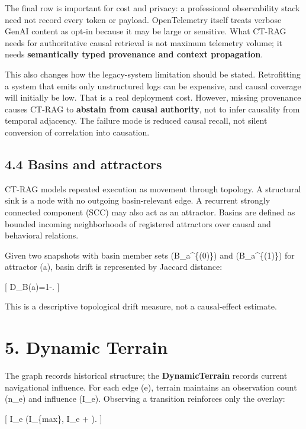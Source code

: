 \documentclass[
  11pt,
]{article}
\begin{document}
The final row is important for cost and privacy: a professional
observability stack need not record every token or payload.
OpenTelemetry itself treats verbose GenAI content as opt-in because it
may be large or sensitive. What CT-RAG needs for authoritative causal
retrieval is not maximum telemetry volume; it needs \textbf{semantically
typed provenance and context propagation}.

This also changes how the legacy-system limitation should be stated.
Retrofitting a system that emits only unstructured logs can be expensive,
and causal coverage will initially be low. That is a real deployment
cost. However, missing provenance causes CT-RAG to \textbf{abstain from
causal authority}, not to infer causality from temporal adjacency. The
failure mode is reduced causal recall, not silent conversion of
correlation into causation.

\subsection{4.4 Basins and attractors}\label{basins-and-attractors}

CT-RAG models repeated execution as movement through topology. A
structural sink is a node with no outgoing basin-relevant edge. A
recurrent strongly connected component (SCC) may also act as an
attractor. Basins are defined as bounded incoming neighborhoods of
registered attractors over causal and behavioral relations.

Given two snapshots with basin member sets (B\_a\^{}\{(0)\}) and
(B\_a\^{}\{(1)\}) for attractor (a), basin drift is represented by
Jaccard distance:

{[}
D\_B(a)=1-.
{]}

This is a descriptive topological drift measure, not a causal-effect
estimate.

\section{5. Dynamic Terrain}\label{dynamic-terrain}

The graph records historical structure; the \textbf{DynamicTerrain}
records current navigational influence. For each edge (e), terrain
maintains an observation count (n\_e) and influence (I\_e). Observing a
transition reinforces only the overlay:

{[} I\_e \leftarrow \min(I\_\{max\}, I\_e + \alpha). {]}
\end{document}
